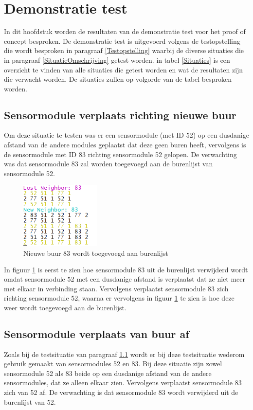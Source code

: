 \documentclass[a4paper, 11pt]{article}
\begin{document}
\section{Demonstratie test}
In dit hoofdstuk worden de resultaten van de demonstratie test voor het proof of concept besproken. De demonstratie test is uitgevoerd volgens de testopstelling die wordt besproken in paragraaf \ref{Testopstelling} waarbij de diverse situaties die in paragraaf \ref{SituatieOmschrijving} getest worden. in tabel \ref{Situaties} is een overzicht te vinden van alle situaties die getest worden en wat de resultaten zijn die verwacht worden. De situaties zullen op volgorde van de tabel besproken worden.
\subsection{Sensormodule verplaats richting nieuwe buur} \label{VerplaatsNaar}
Om deze situatie te testen was er een sensormodule (met ID 52) op een dusdanige afstand van de andere modules geplaatst dat deze geen buren heeft, vervolgens is de sensormodule met ID 83 richting sensormodule 52 gelopen. De verwachting was dat sensormodule 83 zal worden toegevoegd aan de burenlijst van sensormodule 52.
\begin{figure}[h!]
	\centering
	\includegraphics[width=4cm]{TestResults/LooptNaarNode/LoopNaarNieuweBuur_52_83.PNG}
	\caption{Nieuwe buur 83 wordt toegevoegd aan burenlijst} \label{LoopNaarNode}
\end{figure}
In figuur \ref{LoopNaarNode} is eerst te zien hoe sensormodule 83 uit de burenlijst verwijderd wordt omdat sensormodule 52 met een dusdanige afstand is verplaatst dat ze niet meer met elkaar in verbinding staan. Vervolgens verplaatst sensormodule 83 zich richting sensormodule 52, waarna er vervolgens in figuur \ref{LoopNaarNode} te zien is hoe deze weer wordt toegevoegd aan de burenlijst.

\subsection{Sensormodule verplaats van buur af}
Zoals bij de testsituatie van paragraaf \ref{VerplaatsNaar} wordt er bij deze testsituatie wederom gebruik gemaakt van sensormodules 52 en 83. Bij deze situatie zijn zowel sensormodule 52 als 83 beide op een dusdanige afstand van de andere sensormodules, dat ze alleen elkaar zien. Vervolgens verplaatst sensormodule 83 zich van 52 af. De verwachting is dat sensormodule 83 wordt verwijderd uit de burenlijst van 52.
\newpage
\end{document}
